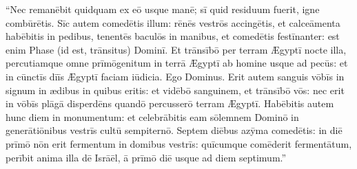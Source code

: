 ``Nec remanēbit quidquam ex eō usque manē; sī quid
residuum fuerit, igne
combūrētis. Sīc autem comedētis illum:
rēnēs vestrōs accingētis, et
calceāmenta habēbitis in pedibus,
tenentēs baculōs in manibus, et comedētis festīnanter: est
enim Phase (id est, trānsitus) Dominī. Et trānsībō per
terram Ægyptī nocte illa, percutiamque omne prīmōgenitum in
terrā Ægyptī ab homine usque ad pecūs: et in cūnctīs dīīs Ægyptī faciam
iūdicia. Ego Dominus. Erit autem sanguis vōbīs in signum
in ædibus in quibus eritis: et vidēbō sanguinem, et
trānsībō vōs: nec erit in vōbīs plāgā
disperdēns quandō percusserō terram Ægyptī. Habēbitis
autem hunc diem in monumentum: et
celebrābitis eam sōlemnem Dominō in
generātiōnibus vestrīs cultū sempiternō.
Septem diēbus azȳma comedētis: in diē prīmō nōn erit
fermentum in domibus vestrīs: quīcumque comēderit
fermentātum, perībit anima illa dē Isrāēl, ā prīmō diē
usque ad diem septimum.''

